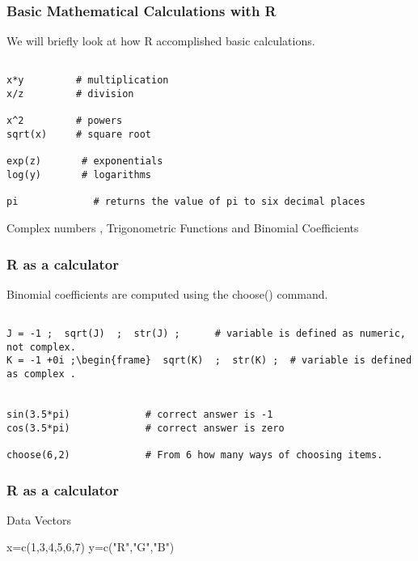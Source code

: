 \begin{frame}[fragile]
\frametitle{Basic Mathematical Calculations with R}

We will briefly look at how R accomplished basic calculations.


\begin{framed}
\begin{verbatim}

x*y			# multiplication
x/z			# division

x^2			# powers
sqrt(x)		# square root

exp(z)		 # exponentials   
log(y)		 # logarithms

pi             # returns the value of pi to six decimal places
\end{verbatim}
\end{framed}
 
Complex numbers , Trigonometric  Functions and Binomial Coefficients

\end{frame}
\begin{frame}
\frametitle{R as a calculator}
Binomial coefficients are computed using the choose() command.

\begin{framed}
\begin{verbatim}

J = -1 ;  sqrt(J)  ;  str(J) ;      # variable is defined as numeric, not complex.
K = -1 +0i ;\begin{frame}  sqrt(K)  ;  str(K) ;  # variable is defined as complex .


sin(3.5*pi)             # correct answer is -1
cos(3.5*pi)             # correct answer is zero
 
choose(6,2)             # From 6 how many ways of choosing items.
\end{verbatim}
\end{framed} 
\end{frame}
\begin{frame}
\frametitle{R as a calculator}
Data Vectors

x=c(1,3,4,5,6,7)
y=c("R","G","B")

\end{frame}
